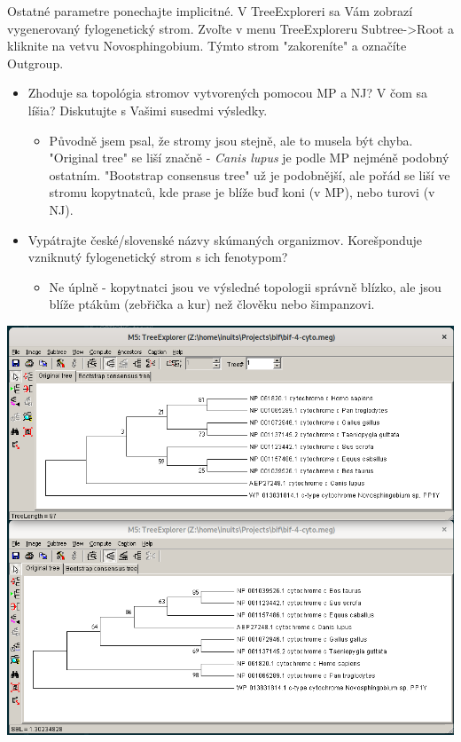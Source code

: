 \documentclass[11pt]{article}
\begin{document}
Ostatné parametre ponechajte implicitné. V TreeExploreri sa Vám zobrazí
vygenerovaný fylogenetický strom. Zvoľte v menu TreeExploreru Subtree->Root a
kliknite na vetvu Novosphingobium.  Týmto strom "zakoreníte" a označíte
Outgroup.

\begin{itemize}
\item Zhoduje sa topológia stromov vytvorených pomocou MP a NJ? V čom sa líšia?
Diskutujte s Vašimi susedmi výsledky.
\begin{itemize}
\item Původně jsem psal, že stromy jsou stejně, ale to musela být chyba. "Original
tree" se liší značně - \emph{Canis lupus} je podle MP nejméně podobný
ostatním. "Bootstrap consensus tree" už je podobnější, ale pořád se liší ve
stromu kopytnatců, kde prase je blíže buď koni (v MP), nebo turovi (v NJ).
\end{itemize}
\item Vypátrajte české/slovenské názvy skúmaných organizmov. Korešponduje vzniknutý
fylogenetický strom s ich fenotypom?
\begin{itemize}
\item Ne úplně - kopytnatci jsou ve výsledné topologii správně blízko, ale jsou blíže
ptákům (zebřička a kur) než člověku nebo šimpanzovi.
\end{itemize}
\end{itemize}

\begin{center}
\includegraphics[width=1.2\linewidth]{./bif-4-cytotree.png}
\end{center}
\end{document}
